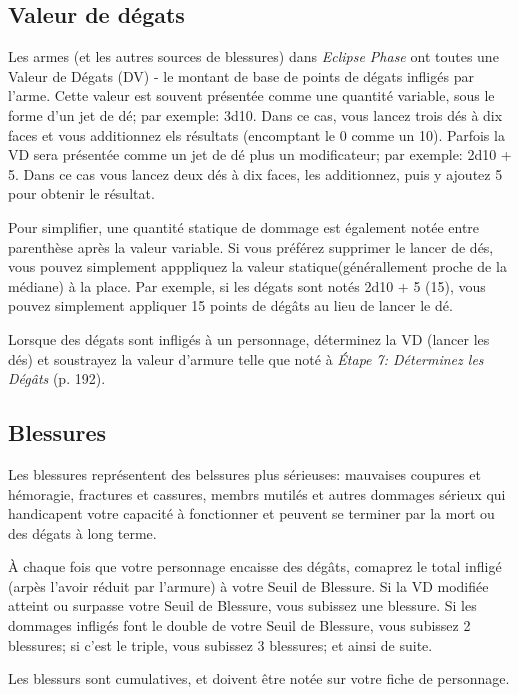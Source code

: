 \subsection{Valeur de dégats} 

Les armes (et les autres sources de blessures) dans \emph{Eclipse Phase} ont toutes une Valeur de Dégats (DV) - le montant de base de points de dégats infligés par l'arme. Cette valeur est souvent présentée comme une quantité variable, sous le forme d'un jet de dé; par exemple: 3d10. Dans ce cas, vous lancez trois dés à dix faces et vous additionnez els résultats (encomptant le 0 comme un 10). Parfois la VD sera présentée comme un jet de dé plus un modificateur; par exemple: 2d10 + 5. Dans ce cas vous lancez deux dés à dix faces, les additionnez, puis y ajoutez 5 pour obtenir le résultat. 

Pour simplifier, une quantité statique de dommage est également notée entre parenthèse après la valeur variable. Si vous préférez supprimer le lancer de dés, vous pouvez simplement apppliquez la valeur statique(générallement proche de la médiane) à la place. Par exemple, si les dégats sont notés 2d10 + 5 (15), vous pouvez simplement appliquer 15 points de dégâts au lieu de lancer le dé. 

Lorsque des dégats sont infligés à un personnage, déterminez la VD (lancer les dés) et soustrayez la valeur d'armure telle que noté à \emph{Étape 7: Déterminez les Dégâts} (p. 192). 

\subsection{Blessures} \label{sec:wounds} 

Les blessures représentent des belssures plus sérieuses: mauvaises coupures et hémoragie, fractures et cassures, membrs mutilés et autres dommages sérieux qui handicapent votre capacité à fonctionner et peuvent se terminer par la mort ou des dégats à long terme. 

À chaque fois que votre personnage encaisse des dégâts, comaprez le total infligé (arpès l'avoir réduit par l'armure) à votre Seuil de Blessure. Si la VD modifiée atteint ou surpasse votre Seuil de Blessure, vous subissez une blessure. Si les dommages infligés font le double de votre Seuil de Blessure, vous subissez 2 blessures; si c'est le triple, vous subissez 3 blessures; et ainsi de suite. 

Les blessurs sont cumulatives, et doivent être notée sur votre fiche de personnage. 

